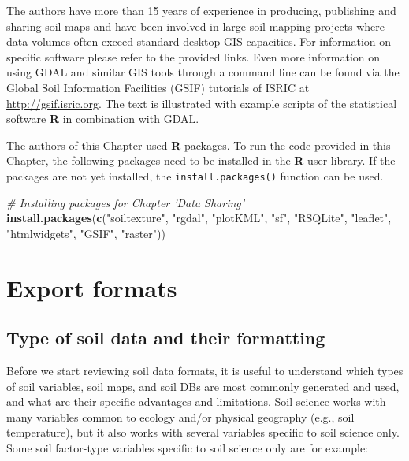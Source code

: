 \documentclass[10pt,b5paper,]{book}
\newenvironment{Shaded}{\begin{snugshade}}{\end{snugshade}}
\newcommand{\CommentTok}[1]{\textcolor[rgb]{0.56,0.35,0.01}{\textit{#1}}}
\newcommand{\KeywordTok}[1]{\textcolor[rgb]{0.13,0.29,0.53}{\textbf{#1}}}
\newcommand{\NormalTok}[1]{#1}
\newcommand{\StringTok}[1]{\textcolor[rgb]{0.31,0.60,0.02}{#1}}
\theoremstyle{definition}
\theoremstyle{definition}
\theoremstyle{definition}
\theoremstyle{remark}
\begin{document}
The authors have more than 15 years of experience in producing,
publishing and sharing soil maps and have been involved in large soil
mapping projects where data volumes often exceed standard desktop GIS
capacities. For information on specific software please refer to the
provided links. Even more information on using GDAL and similar GIS
tools through a command line can be found via the Global Soil
Information Facilities (GSIF) tutorials of ISRIC at
\url{http://gsif.isric.org}. The text is illustrated with example
scripts of the statistical software \textbf{R} in combination with GDAL.

The authors of this Chapter used \textbf{R} packages. To run the code
provided in this Chapter, the following packages need to be installed in
the \textbf{R} user library. If the packages are not yet installed, the
\texttt{install.packages()} function can be used.

\begin{Shaded}
\begin{Highlighting}[]
\CommentTok{# Installing packages for Chapter 'Data Sharing'}
\KeywordTok{install.packages}\NormalTok{(}\KeywordTok{c}\NormalTok{(}\StringTok{"soiltexture"}\NormalTok{, }\StringTok{"rgdal"}\NormalTok{, }\StringTok{"plotKML"}\NormalTok{,}
                   \StringTok{"sf"}\NormalTok{, }\StringTok{"RSQLite"}\NormalTok{, }\StringTok{"leaflet"}\NormalTok{,}
                   \StringTok{"htmlwidgets"}\NormalTok{, }\StringTok{"GSIF"}\NormalTok{, }\StringTok{"raster"}\NormalTok{))}
\end{Highlighting}
\end{Shaded}

\hypertarget{export-formats}{%
\section{Export formats}\label{export-formats}}

\hypertarget{type-of-soil-data-and-their-formatting}{%
\subsection{Type of soil data and their
formatting}\label{type-of-soil-data-and-their-formatting}}

Before we start reviewing soil data formats, it is useful to understand
which types of soil variables, soil maps, and soil DBs are most commonly
generated and used, and what are their specific advantages and
limitations. Soil science works with many variables common to ecology
and/or physical geography (e.g., soil temperature), but it also works
with several variables specific to soil science only. Some soil
factor-type variables specific to soil science only are for example:
\end{document}
